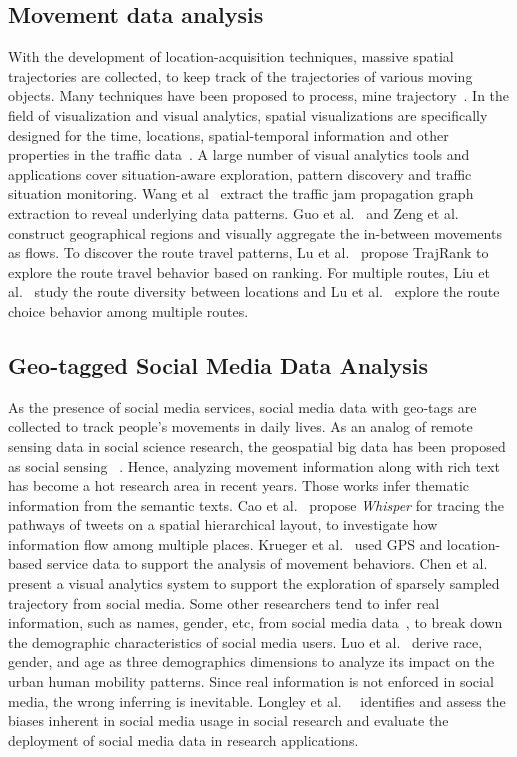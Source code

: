 \documentclass{ieeeaccess}
\begin{document}
\subsection{Movement data analysis}
With the development of location-acquisition techniques, massive spatial trajectories are collected, to keep track of the trajectories of various moving objects. Many techniques have been proposed to process, mine trajectory~\cite{Zheng2015_trajectory}. In the field of visualization and visual analytics, spatial visualizations are specifically designed for the time, locations, spatial-temporal information and other properties in the traffic data~\cite{chen2015survey}. A large number of visual analytics tools and applications cover situation-aware exploration, pattern discovery and traffic situation monitoring. Wang et al~\cite{wang2013visual} extract the traffic jam propagation graph extraction to reveal underlying data patterns. Guo et al.~\cite{guo2011tripvista} and Zeng et al.~\cite{zeng2013visualizing} construct geographical regions and visually aggregate the in-between movements as flows. To discover the route travel patterns, Lu et al.~\cite{lu2015trajrank} propose TrajRank to explore the route travel behavior based on ranking. For multiple routes, Liu et al.~\cite{liu2011_routediversity} study the route diversity between locations and Lu et al.~\cite{Lu2017_multipleroute} explore the route choice behavior among multiple routes.

\subsection{Geo-tagged Social Media Data Analysis}
As the presence of social media services, social media data with geo-tags are collected to track people's movements in daily lives. As an analog of remote sensing data in social science research, the geospatial big data has been proposed as social sensing ~\cite{liu2015social}. Hence, analyzing movement information along with rich text has become a hot research area in recent years. Those works infer thematic information from the semantic texts. Cao et al.~\cite{cao2012whisper} propose \textit{Whisper} for tracing the pathways of tweets on a spatial hierarchical layout, to investigate how information flow among multiple places. Krueger et al.~\cite{krueger2014visual} used GPS and location-based service data to support the analysis of movement behaviors. Chen et al.~\cite{chen2016interactive} present a visual analytics system to support the exploration of sparsely sampled trajectory from social media. Some other researchers tend to infer real information, such as names, gender, etc, from social media data~\cite{peddinti2014internet}, to break down the demographic characteristics of social media users. Luo et al.~\cite{luo2016explore} derive race, gender, and age as three demographics dimensions to analyze its impact on the urban human mobility patterns. Since real information is not enforced in social media, the wrong inferring is inevitable. Longley et al.~\cite{Longley2015}~\cite{Paul2016_twitter} identifies and assess the biases inherent in social media usage in social research and evaluate the deployment of social media data in research applications.
\end{document}
